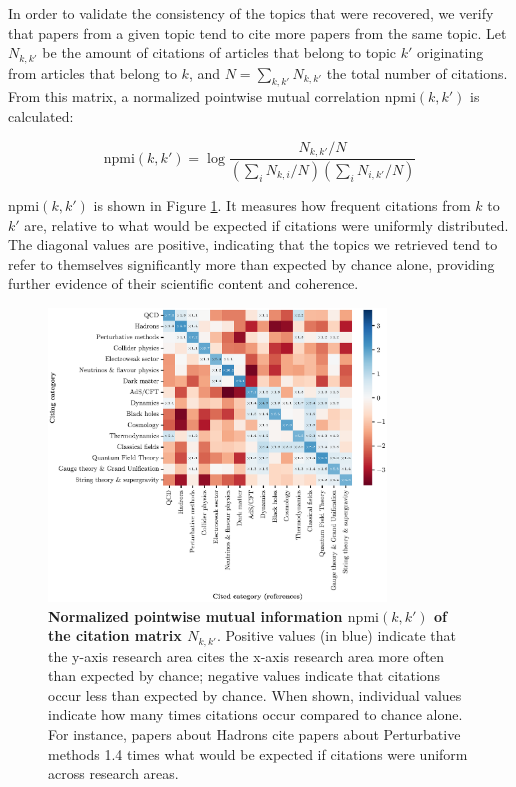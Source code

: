 \documentclass{article}
\begin{document}
In order to validate the consistency of the topics that were recovered, we verify that papers from a given topic tend to cite more papers from the same topic. Let $N_{k,k'}$ be the amount of citations of articles that belong to topic $k'$ originating from articles that belong to $k$, and $N=\sum_{k,k'}N_{k,k'}$ the total number of citations. From this matrix, a normalized pointwise mutual correlation $\mathrm{npmi}(k,k')$ is calculated:

\begin{equation}
    \mathrm{npmi}(k,k') = \log {\dfrac{N_{k,k'}/N}{(\sum_{i} N_{k,i}/N)(\sum_{i} N_{i,k'}/N)}}
\end{equation}

$\mathrm{npmi}(k,k')$ is shown in Figure \ref{fig:topic_citation_matrix}. It measures how frequent citations from $k$ to $k'$ are, relative to what would be expected if citations were uniformly distributed. The diagonal values are positive, indicating that the topics we retrieved tend to refer to themselves significantly more than expected by chance alone, providing further evidence of their scientific content and coherence.

\begin{figure}[H]
    \centering
    \includegraphics[width=0.8\textwidth]{plots/topic_citation_matrix.eps}
    \caption{\textbf{Normalized pointwise mutual information $\mathrm{npmi}(k,k')$ of the citation matrix $N_{k,k'}$}. Positive values (in blue) indicate that the y-axis research area cites the x-axis research area more often than expected by chance; negative values indicate that citations occur less than expected by chance. When shown, individual values indicate how many times citations occur compared to chance alone. For instance, papers about Hadrons cite papers about Perturbative methods 1.4 times what would be expected if citations were uniform across research areas.}
    \label{fig:topic_citation_matrix}
\end{figure}
\end{document}
